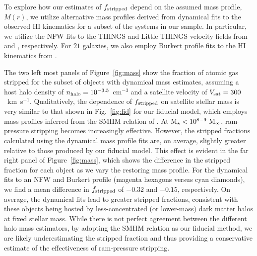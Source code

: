 To explore how our estimates of $f_{\rm stripped}$ depend on the
assumed mass profile, $M(r)$, we utilize alternative mass profiles
derived from dynamical fits to the observed H{\scriptsize I}
kinematics for a subset of the systems in our sample. In particular,
we utilize the NFW fits to the THINGS and Little THINGS velocity
fields from \citet{deblok08} and \citet{oh15}, respectively. 
%
For $21$ galaxies, we also employ Burkert profile fits to the
H{\scriptsize I} kinematics from \citet{pace16}.
%


The two left most panels of Figure~\ref{fig:mass} show the fraction of
atomic gas stripped for the subset of objects with dynamical mass
estimates, assuming a host halo density of $n_{\rm halo} =
10^{-3.5}$~cm$^{-3}$ and a satellite velocity of $V_{\rm
  sat} = 300$~km~s$^{-1}$. 
%
Qualitatively, the dependence of $f_{\rm stripped}$ on satellite
stellar mass is very similar to that shown in Fig.~\ref{fig:fid} for
our fiducial model, which employs mass profiles inferred from the SMHM
relation of \citet{gk14}.
%
At ${\rm M}_{\star} < 10^{8-9}~{\rm M}_{\odot}$, ram-pressure stripping becomes
increasingly effective. 
%
However, the stripped fractions calculated using the dynamical mass
profile fits are, on average, slightly greater relative to those
produced by our fiducial model. 
%
This effect is evident in the far right panel of
Figure~\ref{fig:mass}, which shows the difference in the stripped
fraction for each object as we vary the restoring mass profile.
%
For the dynamical fits to an NFW and Burkert profile (magenta hexagons
versus cyan diamonds), we find a mean difference in $f_{\rm stripped}$
of $-0.32$ and $-0.15$, respectively. 
%
On average, the dynamical fits lead to greater stripped fractions,
consistent with these objects being hosted by less-concentrated (or
lower-mass) dark matter halos at fixed stellar mass. While there is
not perfect agreement between the different halo mass estimators, by
adopting the SMHM relation as our fiducial method, we are likely
underestimating the stripped fraction and thus providing a
conservative estimate of the effectiveness of ram-pressure stripping.






